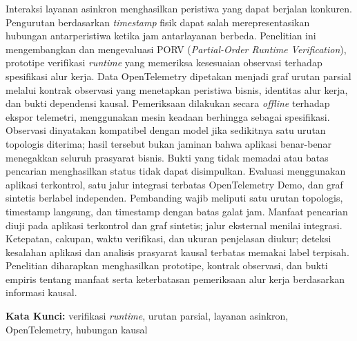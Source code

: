 \documentclass[proposal,indonesia]{ugmskripsi}
\newcommand{\ist}[1]{\textit{#1}}
\begin{document}
\sloppy
\cover
\titlepageind
\approvalpage
\tableofcontents
\clearpage
{}
{}
\listoftables
\clearpage
{}
{}
\listoffigures
\clearpage
{}
{}
\renewcommand{\lstlistlistingname}{DAFTAR LISTING}
\lstlistoflistings

\abstractind
Interaksi layanan asinkron menghasilkan peristiwa yang dapat berjalan konkuren. Pengurutan berdasarkan \ist{timestamp} fisik dapat salah merepresentasikan hubungan antarperistiwa ketika jam antarlayanan berbeda. Penelitian ini mengembangkan dan mengevaluasi PORV (\ist{Partial-Order Runtime Verification}), prototipe verifikasi \ist{runtime} yang memeriksa kesesuaian observasi terhadap spesifikasi alur kerja. Data OpenTelemetry dipetakan menjadi graf urutan parsial melalui kontrak observasi yang menetapkan peristiwa bisnis, identitas alur kerja, dan bukti dependensi kausal. Pemeriksaan dilakukan secara \ist{offline} terhadap ekspor telemetri, menggunakan mesin keadaan berhingga sebagai spesifikasi. Observasi dinyatakan kompatibel dengan model jika sedikitnya satu urutan topologis diterima; hasil tersebut bukan jaminan bahwa aplikasi benar-benar menegakkan seluruh prasyarat bisnis. Bukti yang tidak memadai atau batas pencarian menghasilkan status tidak dapat disimpulkan. Evaluasi menggunakan aplikasi terkontrol, satu jalur integrasi terbatas OpenTelemetry Demo, dan graf sintetis berlabel independen. Pembanding wajib meliputi satu urutan topologis, timestamp langsung, dan timestamp dengan batas galat jam. Manfaat pencarian diuji pada aplikasi terkontrol dan graf sintetis; jalur eksternal menilai integrasi. Ketepatan, cakupan, waktu verifikasi, dan ukuran penjelasan diukur; deteksi kesalahan aplikasi dan analisis prasyarat kausal terbatas memakai label terpisah. Penelitian diharapkan menghasilkan prototipe, kontrak observasi, dan bukti empiris tentang manfaat serta keterbatasan pemeriksaan alur kerja berdasarkan informasi kausal.

\vspace{0.5cm}
\noindent\textbf{Kata Kunci:} verifikasi \ist{runtime}, urutan parsial, layanan asinkron, OpenTelemetry, hubungan kausal
\endabstractind
\end{document}
